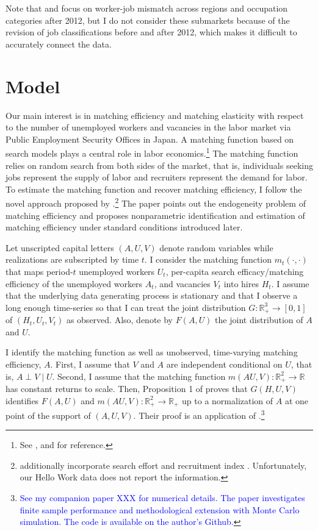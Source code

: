 \documentclass[12pt]{article}
\begin{document}
Note that \cite{kawata2019} and \cite{higashi2018spatial} focus on worker-job mismatch across regions and occupation categories after 2012, but I do not consider these submarkets because of the revision of job classifications before and after 2012, which makes it difficult to accurately connect the data.




\section{Model}
Our main interest is in matching efficiency and matching elasticity with respect to the number of unemployed workers and vacancies in the labor market via Public Employment Security Offices in Japan.
A matching function based on search models plays a central role in labor economics.\footnote{See \cite{pissarides2000equilibrium,petrongolo2001looking}, and \cite{rogerson2005search} for reference.} 
The matching function relies on random search from both sides of the market, that is, individuals seeking jobs represent the supply of labor and recruiters represent the demand for labor.
To estimate the matching function and recover matching efficiency, I follow the novel approach proposed by \cite{lange2020beyond}.\footnote{\cite{lange2020beyond} additionally incorporate search effort \citep{mukoyama2018job} and recruitment index \citep{davis2013establishment}. Unfortunately, our Hello Work data does not report the information.}
The paper points out the endogeneity problem of matching efficiency \citep{borowczyk2013accounting} and proposes nonparametric identification and estimation of matching efficiency under standard conditions introduced later.

Let unscripted capital letters $(A, U, V)$ denote random variables while realizations are subscripted by time $t$. 
I consider the matching function $m_t(\cdot,\cdot)$ that maps period-$t$ unemployed workers $U_t$, per-capita search efficacy/matching efficiency of the unemployed workers $A_t$, and vacancies $V_t$ into hires $H_t$.
I assume that the underlying data generating process is stationary and that I observe a long enough time-series so that I can treat the joint distribution $G: \mathbb{R}_{+}^3 \rightarrow[0,1]$ of $\left(H_t, U_t, V_t\right)$ as observed. 
Also, denote by $F(A, U)$ the joint distribution of $A$ and $U$.

I identify the matching function as well as unobserved, time-varying matching efficiency, $A .$ 
First, I assume that $V$ and $A$ are independent conditional on $U$, that is, $A \perp V \mid U$. 
Second, I assume that the matching function $m(AU,V):\mathbb{R}_{+}^2 \rightarrow \mathbb{R}$ has constant returns to scale. 
Then, Proposition 1 of \cite{lange2020beyond} proves that $G(H, U, V)$ identifies $F(A, U)$ and $m(A U, V): \mathbb{R}_{+}^2 \rightarrow \mathbb{R}_{+}$ up to a normalization of $A$ at one point of the support of $(A, U, V)$. Their proof is an application of \cite{matzkin2003nonparametric}.\footnote{\textcolor{blue}{See my companion paper XXX for numerical details. The paper investigates finite sample performance and methodological extension with Monte Carlo simulation. The code is available on the author's Github.}}
\end{document}
